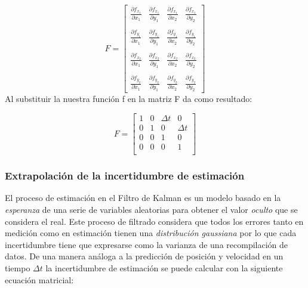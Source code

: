 \begin{equation}
F =
\begin{bmatrix}
\frac{\partial f_{x_1}}{\partial x_1} & \frac{\partial f_{x_1}}{\partial y_1} & \frac{\partial f_{x_1}}{\partial x_2} & \frac{\partial f_{x_1}}{\partial y_2}\\
\\
\frac{\partial f_{y_1}}{\partial x_1} & \frac{\partial f_{y_1}}{\partial y_1} & \frac{\partial f_{y_1}}{\partial x_2} & \frac{\partial f_{y_1}}{\partial y_2}\\
\\
\frac{\partial f_{x_2}}{\partial x_1} & \frac{\partial f_{x_2}}{\partial y_1} & \frac{\partial f_{x_2}}{\partial x_2} & \frac{\partial f_{x_2}}{\partial y_2}\\
\\
\frac{\partial f_{y_2}}{\partial x_1} & \frac{\partial f_{y_2}}{\partial y_1} & \frac{\partial f_{y_2}}{\partial x_2} & \frac{\partial f_{y_2}}{\partial y_2}
\end{bmatrix}
\end{equation}
Al substituir la nuestra función  f en la matriz F da como resultado:

\begin{equation}
F =
\begin{bmatrix}
1 & 0 & \Delta t & 0\\ 
0 & 1 & 0 & \Delta t\\
0 & 0 & 1 & 0\\
0 & 0 & 0 & 1\\
\end{bmatrix}
\end{equation}

		\subsubsection*{Extrapolación de la incertidumbre de estimación}
	El proceso de estimación en el Filtro de Kalman es un modelo basado en la \textit{esperanza} de una serie de variables aleatorias para obtener el valor \textit{oculto} que se considera el real. Este proceso de filtrado considera que todos los errores tanto en medición como en estimación tienen una \textit{distribución gaussiana} por lo que cada incertidumbre tiene que expresarse como la varianza de una recompilación de datos. De una manera análoga a la predicción de posición y velocidad en un tiempo $\Delta t$ la incertidumbre de estimación se puede calcular con la siguiente ecuación matricial:
	
